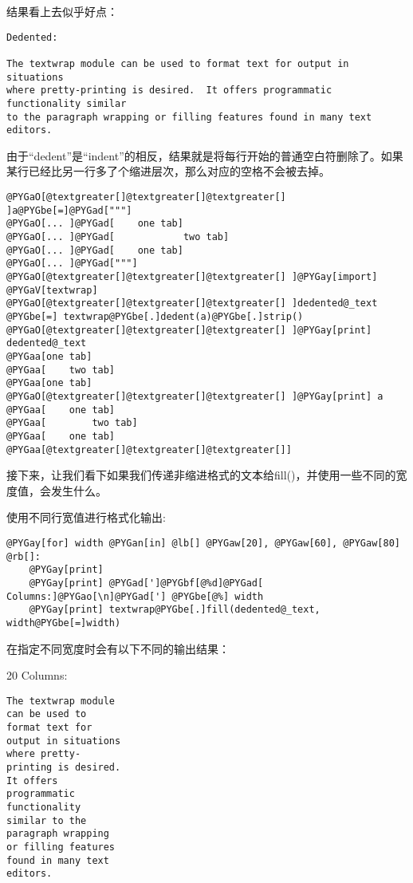 \documentclass[a4paper,10pt,english]{manual}
\begin{document}
结果看上去似乎好点：

\begin{Verbatim}[commandchars=@\[\]]
Dedented:

The textwrap module can be used to format text for output in situations
where pretty-printing is desired.  It offers programmatic functionality similar
to the paragraph wrapping or filling features found in many text editors.
\end{Verbatim}

由于“dedent”是“indent”的相反，结果就是将每行开始的普通空白符删除了。如果某行已经比另一行多了个缩进层次，那么对应的空格不会被去掉。

\begin{Verbatim}[commandchars=@\[\]]
@PYGaO[@textgreater[]@textgreater[]@textgreater[] ]a@PYGbe[=]@PYGad["""]
@PYGaO[... ]@PYGad[    one tab]
@PYGaO[... ]@PYGad[            two tab]
@PYGaO[... ]@PYGad[    one tab]
@PYGaO[... ]@PYGad["""]
@PYGaO[@textgreater[]@textgreater[]@textgreater[] ]@PYGay[import] @PYGaV[textwrap]
@PYGaO[@textgreater[]@textgreater[]@textgreater[] ]dedented@_text @PYGbe[=] textwrap@PYGbe[.]dedent(a)@PYGbe[.]strip()
@PYGaO[@textgreater[]@textgreater[]@textgreater[] ]@PYGay[print] dedented@_text
@PYGaa[one tab]
@PYGaa[    two tab]
@PYGaa[one tab]
@PYGaO[@textgreater[]@textgreater[]@textgreater[] ]@PYGay[print] a
@PYGaa[    one tab]
@PYGaa[        two tab]
@PYGaa[    one tab]
@PYGaa[@textgreater[]@textgreater[]@textgreater[]]
\end{Verbatim}

接下来，让我们看下如果我们传递非缩进格式的文本给fill()，并使用一些不同的宽度值，会发生什么。

使用不同行宽值进行格式化输出:

\begin{Verbatim}[commandchars=@\[\]]
@PYGay[for] width @PYGan[in] @lb[] @PYGaw[20], @PYGaw[60], @PYGaw[80] @rb[]:
    @PYGay[print]
    @PYGay[print] @PYGad[']@PYGbf[@%d]@PYGad[ Columns:]@PYGao[\n]@PYGad['] @PYGbe[@%] width
    @PYGay[print] textwrap@PYGbe[.]fill(dedented@_text, width@PYGbe[=]width)
\end{Verbatim}

在指定不同宽度时会有以下不同的输出结果：

20 Columns:

\begin{Verbatim}[commandchars=@\[\]]
The textwrap module
can be used to
format text for
output in situations
where pretty-
printing is desired.
It offers
programmatic
functionality
similar to the
paragraph wrapping
or filling features
found in many text
editors.
\end{Verbatim}
\end{document}
